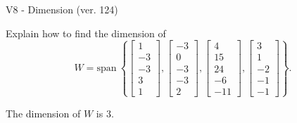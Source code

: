 \begin{exercise}
  \begin{exerciseTitle}V8 - Dimension (ver. 124)\end{exerciseTitle}
  \begin{exerciseStatement}
    Explain how to find the dimension of 
\[W=\mathrm{span}\ \left\{\left[\begin{array}{r}
1 \\
-3 \\
-3 \\
3 \\
1
\end{array}\right] , \left[\begin{array}{r}
-3 \\
0 \\
-3 \\
-3 \\
2
\end{array}\right] , \left[\begin{array}{r}
4 \\
15 \\
24 \\
-6 \\
-11
\end{array}\right] , \left[\begin{array}{r}
3 \\
1 \\
-2 \\
-1 \\
-1
\end{array}\right]\right\}.\]



  \end{exerciseStatement}
  \begin{exerciseAnswer}
   The dimension of \(W\) is  \(3\).
  


  \end{exerciseAnswer}
\end{exercise}
